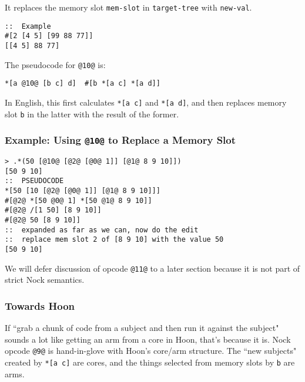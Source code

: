 \documentclass[twoside]{article}
\begin{document}
\noindent
It replaces the memory slot \lstinline[style=inlinecode]{mem-slot} in \lstinline[style=inlinecode]{target-tree} with \lstinline[style=inlinecode]{new-val}.

\begin{lstlisting}[style=listingblock]
::  Example
#[2 [4 5] [99 88 77]]
[[4 5] 88 77]
\end{lstlisting}

\noindent
The pseudocode for \lstinline[style=inlinecode]{@10@} is:

\begin{lstlisting}[style=listingcode]
*[a @10@ [b c] d]  #[b *[a c] *[a d]]
\end{lstlisting}

In English, this first calculates \lstinline[style=inlinecode]{*[a c]} and \lstinline[style=inlinecode]{*[a d]}, and then replaces memory slot \lstinline[style=inlinecode]{b} in the latter with the result of the former.

\subsubsection{Example: Using \lstinline[style=inlinecode]{@10@} to Replace a Memory Slot}

\begin{lstlisting}[style=listingcode]
> .*(50 [@10@ [@2@ [@0@ 1]] [@1@ 8 9 10]])
[50 9 10]
::  PSEUDOCODE
*[50 [10 [@2@ [@0@ 1]] [@1@ 8 9 10]]]
#[@2@ *[50 @0@ 1] *[50 @1@ 8 9 10]]
#[@2@ /[1 50] [8 9 10]]
#[@2@ 50 [8 9 10]]
::  expanded as far as we can, now do the edit
::  replace mem slot 2 of [8 9 10] with the value 50
[50 9 10]
\end{lstlisting}

We will defer discussion of opcode \lstinline[style=inlinecode]{@11@} to a later section because it is not part of strict Nock semantics.

\subsubsection{Towards Hoon}

If ``grab a chunk of code from a subject and then run it against the subject" sounds a lot like getting an arm from a core in Hoon, that's because it is.  Nock opcode \lstinline[style=inlinecode]{@9@} is hand-in-glove with Hoon's core/arm structure.  The ``new subjects" created by \lstinline[style=inlinecode]{*[a c]} are cores, and the things selected from memory slots by \lstinline[style=inlinecode]{b} are arms.
\end{document}
